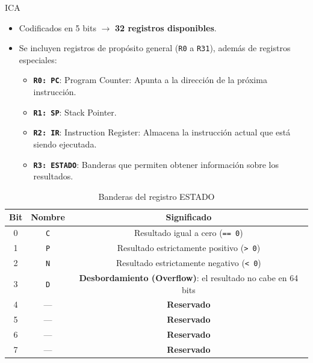 ICA\documentclass{article}
\begin{document}
\begin{itemize}
  \item Codificados en 5 bits $\rightarrow$ \textbf{32 registros disponibles}.
  \item Se incluyen registros de propósito general (\texttt{R0} a \texttt{R31}), además de registros especiales:
        \begin{itemize}
          \item \textbf{\texttt{R0: PC}}: Program Counter: Apunta a la dirección de la próxima instrucción.
          \item \textbf{\texttt{R1: SP}}: Stack Pointer.
          \item \textbf{\texttt{R2: IR}}: Instruction Register: Almacena la instrucción actual que está siendo ejecutada.
          \item \textbf{\texttt{R3: ESTADO}}: Banderas que permiten obtener información sobre los resultados.
        \end{itemize}
\end{itemize}

\begin{table}[H]
  \centering
  \begin{tabular}{|c|c|c|}
    \hline
    \textbf{Bit} & \textbf{Nombre} & \textbf{Significado}                                                \\
    \hline
    0            & \texttt{C}      & Resultado igual a cero (\texttt{== 0})                              \\
    1            & \texttt{P}      & Resultado estrictamente positivo (\texttt{> 0})                     \\
    2            & \texttt{N}      & Resultado estrictamente negativo (\texttt{< 0})                     \\
    3            & \texttt{D}      & \textbf{Desbordamiento (Overflow)}: el resultado no cabe en 64 bits \\
    4            & —               & \textbf{Reservado}                                                  \\
    5            & —               & \textbf{Reservado}                                                  \\
    6            & —               & \textbf{Reservado}                                                  \\
    7            & —               & \textbf{Reservado}                                                  \\
    \hline
  \end{tabular}
  \caption{Banderas del registro ESTADO}
\end{table}
\end{document}
